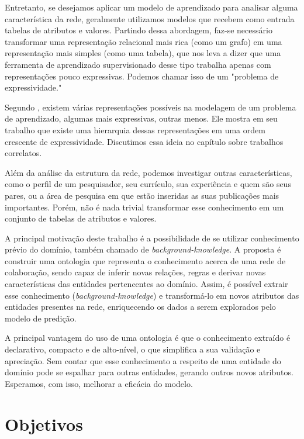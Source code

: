 Entretanto, se desejamos aplicar um modelo de aprendizado para analisar alguma característica da rede, geralmente utilizamos modelos que recebem como entrada tabelas de atributos e valores. Partindo dessa abordagem, faz-se necessário transformar uma representação relacional mais rica (como um grafo) em uma representação mais simples (como uma tabela), que nos leva a dizer que uma ferramenta de aprendizado supervisionado desse tipo trabalha apenas com representações pouco expressivas. Podemos chamar isso de um "problema de expressividade."

Segundo \citet{Raedt2008}, existem várias representações possíveis na modelagem de um problema de aprendizado, algumas mais expressivas, outras menos. Ele mostra em seu trabalho que existe uma hierarquia dessas representações em uma ordem crescente de expressividade. Discutimos essa ideia no capítulo sobre trabalhos correlatos.

Além da análise da estrutura da rede, podemos investigar outras características, como o perfil de um pesquisador, seu currículo, sua experiência e quem são seus pares, ou a área de pesquisa em que estão inseridas as suas publicações mais importantes. Porém, não é nada trivial transformar esse conhecimento em um conjunto de tabelas de atributos e valores.

A principal motivação deste trabalho é a possibilidade de se utilizar conhecimento prévio do domínio, também chamado de \textit{background-knowledge}. A proposta é construir uma ontologia que representa o conhecimento acerca de uma rede de colaboração, sendo capaz de inferir novas relações, regras e derivar novas características das entidades pertencentes ao domínio. Assim, é possível extrair esse conhecimento (\textit{background-knowledge}) e transformá-lo em novos atributos das entidades presentes na rede, enriquecendo os dados a serem explorados pelo modelo de predição.

A principal vantagem do uso de uma ontologia é que o conhecimento extraído é declarativo, compacto e de alto-nível, o que simplifica a sua validação e apreciação. Sem contar que esse conhecimento a respeito de uma entidade do domínio pode se espalhar para outras entidades, gerando outros novos atributos. Esperamos, com isso, melhorar a eficácia do modelo.

\section{Objetivos}
\label{sec:objetivos}

